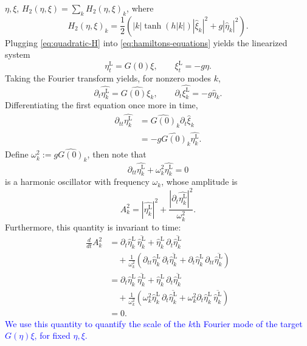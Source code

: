 \documentclass{article}
\begin{document}
$\eta,\xi$, $H_2(\eta,\xi)=\sum_kH_2(\eta,\xi)_k$, where
\begin{equation}
    H_2(\eta,\xi)_k=\frac12
    \left(|k|\tanh(h|k|)|\widehat\xi_k|^2+g|\widehat\eta_k|^2\right).
\end{equation}
Plugging \eqref{eq:quadratic-H} into \eqref{eq:hamiltons-equations} yields
the linearized system
\begin{equation}
    \eta_t^{\mathrm L}=G(0)\xi,\qquad \xi_t^{\mathrm L}=-g\eta.
\end{equation}
Taking the Fourier transform yields, for nonzero modes $k$,
\begin{equation}
    \partial_t\widehat{\eta_k^{\mathrm L}}=\widehat{G(0)\xi_k},
    \qquad \partial_t\widehat{\xi_k^{\mathrm L}}=-g\widehat\eta_k.
\end{equation}
Differentiating the first equation once more in time,
\begin{align}
    \partial_{tt}\widehat{\eta_k^{\mathrm L}}
    &=\widehat{G(0)}_k\partial_t\widehat\xi_k\\
    &=-g\widehat{G(0)}_k\widehat{\eta_k^{\mathrm L}}.
\end{align}
Define $\omega_k^2:=g\widehat{G(0)}_k$, then note that
\begin{equation}
    \partial_{tt}\widehat{\eta_k^{\mathrm L}}
       +\omega_k^2\widehat{\eta_k^{\mathrm L}}=0
\end{equation}
is a harmonic oscillator with frequency $\omega_k$, whose amplitude is
\begin{equation}
    A_k^2=|\widehat{\eta_k^{\mathrm L}}|^2
      +\frac{|\partial_t\widehat{\eta_k^{\mathrm L}}|^2}{\omega_k^2}.
\end{equation}
Furthermore, this quantity is invariant to time:
\begin{align*}
\frac{d}{dt}A_k^2
&=\partial_t\widehat\eta_k^{\mathrm L}\,
    \overline{\widehat\eta_k^{\mathrm L}}
  +\widehat\eta_k^{\mathrm L}\,
    \partial_t\overline{\widehat\eta_k^{\mathrm L}}\\
&\quad+\frac1{\omega_k^2}
  \left(\partial_{tt}\widehat\eta_k^{\mathrm L}\,
    \partial_t\overline{\widehat\eta_k^{\mathrm L}}
  +\partial_t\widehat\eta_k^{\mathrm L}\,
    \partial_{tt}\overline{\widehat\eta_k^{\mathrm L}}\right)\\
&=\partial_t\widehat\eta_k^{\mathrm L}\,
    \overline{\widehat\eta_k^{\mathrm L}}
  +\widehat\eta_k^{\mathrm L}\,
    \partial_t\overline{\widehat\eta_k^{\mathrm L}}\\
&\quad+\frac1{\omega_k^2}
  \left(\omega_k^2\widehat\eta_k^{\mathrm L}\,
    \partial_t\overline{\widehat\eta_k^{\mathrm L}}
  +\omega_k^2\partial_t\widehat\eta_k^{\mathrm L}\,
    \overline{\widehat\eta_k^{\mathrm L}}\right)\\
&=0.
\end{align*}
\textcolor{blue}{We use this quantity to quantify the scale of the $k$th
Fourier mode of the target $G(\eta)\xi$, for fixed $\eta,\xi$.}
\end{document}
